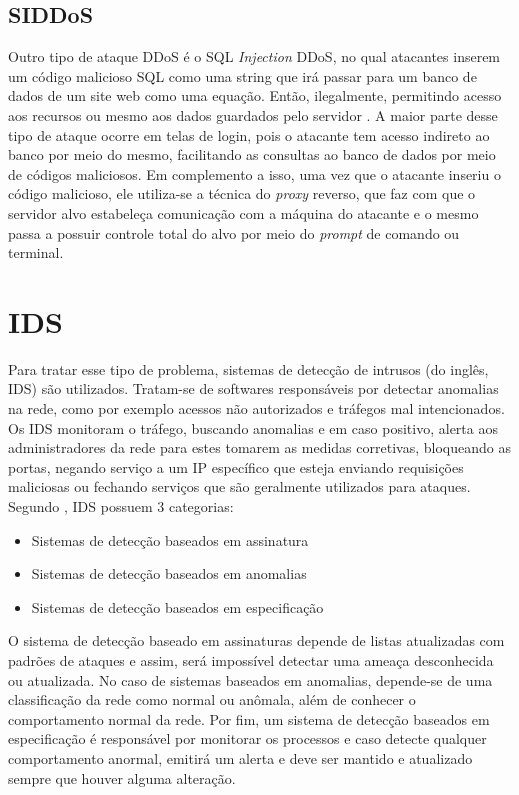 
 \subsection{SIDDoS}   
  Outro tipo de ataque DDoS é o SQL \textit{Injection} DDoS, no qual atacantes inserem um código malicioso SQL como uma string que irá passar para um banco de dados de um site web como uma equação. Então, ilegalmente, permitindo acesso aos recursos ou mesmo aos dados guardados pelo servidor \cite{DataMining}. A maior parte desse tipo de ataque ocorre em telas de login, pois o atacante tem acesso indireto ao banco por meio do mesmo, facilitando as consultas ao banco de dados por meio de códigos maliciosos.   Em complemento a isso, uma vez que o atacante inseriu o código malicioso, ele utiliza-se a técnica do \textit{proxy} reverso, que faz com que o servidor alvo estabeleça comunicação com a máquina do atacante e o mesmo passa a possuir controle total do alvo por meio do \textit{prompt} de comando ou terminal.

\section{IDS}

Para tratar esse tipo de problema, sistemas de detecção de intrusos (do inglês, IDS) são utilizados. Tratam-se de softwares responsáveis  por detectar anomalias na rede, como por exemplo acessos não autorizados e tráfegos mal intencionados. Os IDS monitoram o tráfego, buscando anomalias e em caso positivo, alerta aos administradores da rede para estes tomarem as medidas corretivas, bloqueando as portas, negando serviço a um IP específico que esteja enviando requisições maliciosas ou fechando serviços que são geralmente utilizados para ataques. Segundo \cite{ashoor2011importance}, IDS possuem 3 categorias: 
\begin{itemize}
	\item Sistemas de detecção baseados em assinatura
	\item Sistemas de detecção baseados em anomalias
	\item Sistemas de detecção baseados em especificação
\end{itemize}

O sistema de detecção baseado em assinaturas depende de listas atualizadas com padrões de ataques e assim, será impossível detectar uma ameaça desconhecida ou atualizada. No caso de sistemas baseados em anomalias, depende-se de uma classificação da rede como normal ou anômala, além de conhecer o comportamento normal da rede. Por fim, um sistema de detecção baseados em especificação é responsável por monitorar os processos e caso detecte qualquer comportamento anormal, emitirá um alerta e deve ser mantido e atualizado sempre que houver alguma alteração.

